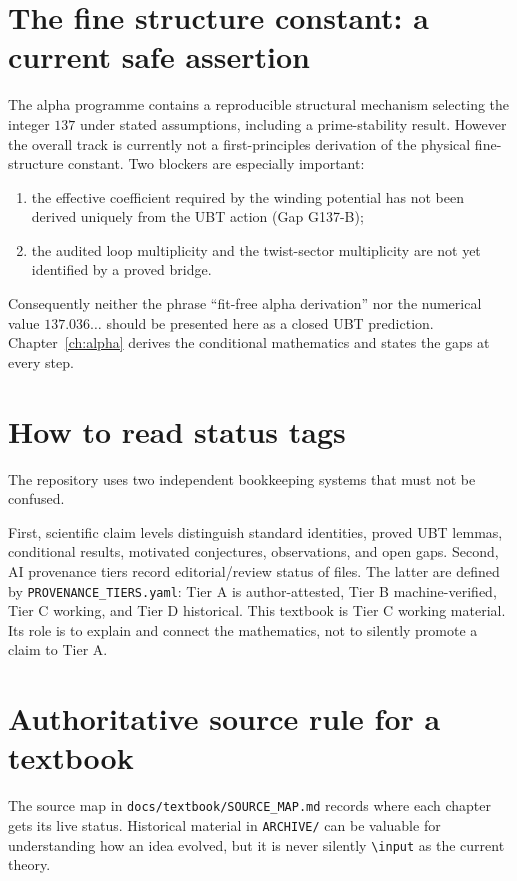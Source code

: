 \section{The fine structure constant: a current safe assertion}
The alpha programme contains a reproducible structural mechanism selecting the
integer $137$ under stated assumptions, including a prime-stability result.
However the overall track is currently not a first-principles derivation of the
physical fine-structure constant.  Two blockers are especially important:
\begin{enumerate}
 \item the effective coefficient required by the winding potential has not been
       derived uniquely from the UBT action (Gap G137-B);
 \item the audited loop multiplicity and the twist-sector multiplicity are not
       yet identified by a proved bridge.
\end{enumerate}
Consequently neither the phrase ``fit-free alpha derivation'' nor the numerical
value $137.036\ldots$ should be presented here as a closed UBT prediction.
Chapter~\ref{ch:alpha} derives the conditional mathematics and states the gaps
at every step.

\section{How to read status tags}
The repository uses two independent bookkeeping systems that must not be
confused.

First, scientific claim levels distinguish standard identities, proved UBT
lemmas, conditional results, motivated conjectures, observations, and open
gaps.  Second, AI provenance tiers record editorial/review status of files.
The latter are defined by \texttt{PROVENANCE\_TIERS.yaml}:
Tier A is author-attested, Tier B machine-verified, Tier C working, and Tier D
historical.  This textbook is Tier C working material.  Its role is to explain
and connect the mathematics, not to silently promote a claim to Tier A.

\section{Authoritative source rule for a textbook}
The source map in \texttt{docs/textbook/SOURCE\_MAP.md} records where each
chapter gets its live status.  Historical material in \texttt{ARCHIVE/} can be
valuable for understanding how an idea evolved, but it is never silently
\texttt{\textbackslash input} as the current theory.

